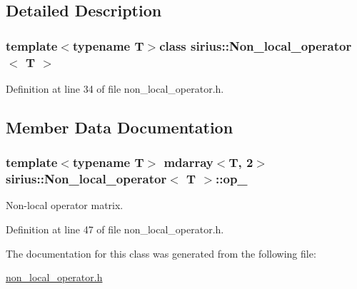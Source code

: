 \subsection{Detailed Description}
\subsubsection*{template$<$typename T$>$class sirius\+::\+Non\+\_\+local\+\_\+operator$<$ T $>$}



Definition at line 34 of file non\+\_\+local\+\_\+operator.\+h.



\subsection{Member Data Documentation}
\hypertarget{classsirius_1_1_non__local__operator_ac9e033a0db6c48d61946dc68bfe7285d}{}
\subsubsection[{op\+\_\+}]{\setlength{\rightskip}{0pt plus 5cm}template$<$typename T$>$ {\bf mdarray}$<$T, 2$>$ {\bf sirius\+::\+Non\+\_\+local\+\_\+operator}$<$ T $>$\+::op\+\_\+\hspace{0.3cm}{\ttfamily [protected]}}\label{classsirius_1_1_non__local__operator_ac9e033a0db6c48d61946dc68bfe7285d}


Non-\/local operator matrix. 



Definition at line 47 of file non\+\_\+local\+\_\+operator.\+h.



The documentation for this class was generated from the following file\+:\begin{DoxyCompactItemize}
\item 
\hyperlink{non__local__operator_8h}{non\+\_\+local\+\_\+operator.\+h}\end{DoxyCompactItemize}

